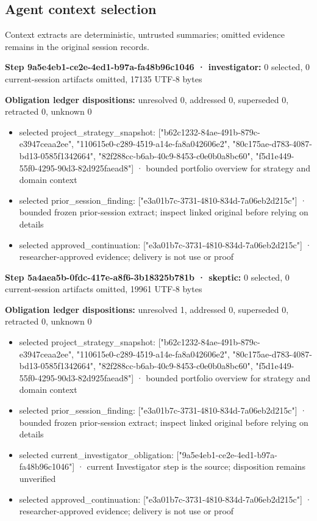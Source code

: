 \documentclass[11pt]{article}
\begin{document}
\subsection{Agent context selection}
Context extracts are deterministic, untrusted summaries; omitted evidence remains in the original session records.\par
\textbf{Step 9a5e4eb1-ce2e-4ed1-b97a-fa48b96c1046 · investigator:} 0 selected, 0 current-session artifacts omitted, 17135 UTF-8 bytes\par
\textbf{Obligation ledger dispositions:} unresolved 0, addressed 0, superseded 0, retracted 0, unknown 0\par
\begin{itemize}
\item selected project\_strategy\_snapshot: ["b62c1232-84ae-491b-879c-e3947ceaa2ee", "110615e0-c289-4519-a14e-fa8a042606e2", "80c175ae-d783-4087-bd13-0585f1342664", "82f288cc-b6ab-40c9-8453-c0e0b0a8bc60", "f5d1e449-55f0-4295-90d3-82d925faead8"] · bounded portfolio overview for strategy and domain context
\item selected prior\_session\_finding: ["e3a01b7c-3731-4810-834d-7a06eb2d215c"] · bounded frozen prior-session extract; inspect linked original before relying on details
\item selected approved\_continuation: ["e3a01b7c-3731-4810-834d-7a06eb2d215c"] · researcher-approved evidence; delivery is not use or proof
\end{itemize}
\textbf{Step 5a4aea5b-0fdc-417e-a8f6-3b18325b781b · skeptic:} 0 selected, 0 current-session artifacts omitted, 19961 UTF-8 bytes\par
\textbf{Obligation ledger dispositions:} unresolved 1, addressed 0, superseded 0, retracted 0, unknown 0\par
\begin{itemize}
\item selected project\_strategy\_snapshot: ["b62c1232-84ae-491b-879c-e3947ceaa2ee", "110615e0-c289-4519-a14e-fa8a042606e2", "80c175ae-d783-4087-bd13-0585f1342664", "82f288cc-b6ab-40c9-8453-c0e0b0a8bc60", "f5d1e449-55f0-4295-90d3-82d925faead8"] · bounded portfolio overview for strategy and domain context
\item selected prior\_session\_finding: ["e3a01b7c-3731-4810-834d-7a06eb2d215c"] · bounded frozen prior-session extract; inspect linked original before relying on details
\item selected current\_investigator\_obligation: ["9a5e4eb1-ce2e-4ed1-b97a-fa48b96c1046"] · current Investigator step is the source; disposition remains unverified
\item selected approved\_continuation: ["e3a01b7c-3731-4810-834d-7a06eb2d215c"] · researcher-approved evidence; delivery is not use or proof
\end{itemize}
\end{document}
